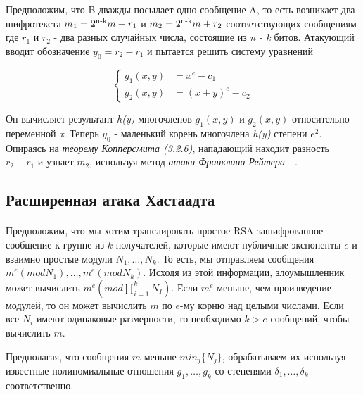   Предположим, что B дважды посылает одно сообщение A, то есть возникает два шифротекста \textit{{$ m_1 = 2\textsuperscript{n-k}m + r_1 $}} и
  \textit{{$ m_2 = 2\textsuperscript{n-k}m + r_2 $}} соответствующих сообщениям где \textit{{$r_1$}} и \textit{{$r_2$}} - два разных случайных числа, состоящие из 
  \textit{n - k} битов. Атакующий вводит обозначение \textit{{$ y_0 = r_2 - r_1 $}} и пытается решить
  систему уравнений
  
    \begin{equation}
	  \begin{cases}
	    g_1(x,y) &= x^e - c_1 \\
	    g_2(x,y) &= (x+y)^e - c_2
	  \end{cases}    
      \end{equation}
      
  Он вычисляет результант \textit{h(y)} многочленов \textit{{$g_1(x,y)$}} и \textit{{$g_2(x,y)$}} относительно переменной \textit{x}. Теперь \textit{{$y_0$}} -
  маленький корень многочлена \textit{h(y)} степени \textit{{$e^2$}}. Опираясь на \textit{теорему Копперсмита (3.2.6)}, нападающий находит разность \textit{{$r_2 - r_1$}} и 
  узнает \textit{{$m_2$}}, используя метод \textit{атаки Франклина-Рейтера} - \cite[страницы 331-332]{may10}.

\subsection{Расширенная атака Хастаадта}

\paragraph{} Предположим, что мы хотим транслировать простое RSA зашифрованное сообщение к группе из {$k$} получателей, которые имеют публичные
  экспоненты {$e$} и взаимно простые модули {$N_1, \dots, N_k$}. То есть, мы отправляем сообщения {$m^e (mod N_1), \dots, m^e (mod N_k)$}. 
  Исходя из этой информации, злоумышленник может вычислить {$m^e (mod \prod_{i=1}^{k}{N_I})$}. Если {$m^e$} меньше, чем произведение модулей, то он 
  может вычислить {$m$} по {$e$}-му корню над целыми числами. Если все {$N_i$} имеют одинаковые размерности, то необходимо {$k > e$} сообщений,
  чтобы вычислить {$m$}.
  
  Предполагая, что сообщения {$m$} меньше {$min_j \{ N_j \}$}, обрабатываем их используя известные полиномиальные отношения {$g_1, \dots, g_k$}
  со степенями {$\delta_1, \dots, \delta_k$} соответственно.
  
